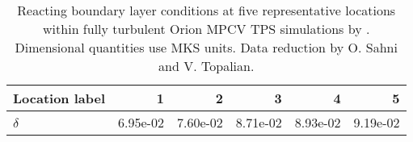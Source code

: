 \begin{table}[p]
\centering
\caption[Reacting boundary layer conditions from
        fully turbulent Orion MPCV TPS simulations]{%
  Reacting boundary layer conditions at five representative locations within
  fully turbulent Orion MPCV TPS simulations by \citet{Bauman2011Loose}.
  Dimensional quantities use MKS units.  Data reduction by O.  Sahni and V.
  Topalian.\label{tbl:BaumanCEVConditions}
}
\renewcommand{\arraystretch}{1.3}
\begin{tabular}{l|rrrrr}
Location label & \hspace{7ex}1 & \hspace{7ex}2 & \hspace{7ex}3 & \hspace{7ex}4 & \hspace{7ex}5 \\
\hline
 $\delta$                                                                          & 6.95e-02  & 7.60e-02  & 8.71e-02  & 8.93e-02  & 9.19e-02  \\

\end{tabular}
\end{table}
